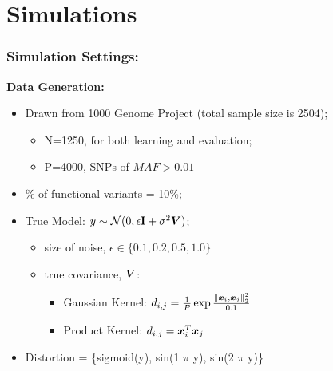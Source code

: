 \documentclass{beamer}
\begin{document}
\section{Simulations}
\begin{frame}
\frametitle{Simulation Settings:}
\textbf{Data Generation:}
\begin{itemize}
\item Drawn from 1000 Genome Project (total sample size is 2504);
  \begin{itemize}
  \item N=1250, for both learning and evaluation;
  \item P=4000, SNPs of $MAF > 0.01$
  \end{itemize}
\item \% of functional variants = 10\%;
\item True Model: $y \sim \mathcal{N}(0, \epsilon \textrm{\textbf{I}} + \sigma^2 \boldsymbol{V})$;
  \begin{itemize}
    \item size of noise, $\epsilon \in \{0.1, 0.2, 0.5, 1.0\}$
    \item true covariance, $\boldsymbol{V}$:
      \begin{itemize}
      \item Gaussian Kernel: $d_{i,j}=\frac{1}{P} \exp{\frac{\left\lVert\boldsymbol{x}_i, \boldsymbol{x}_j\right\rVert_2^2}{0.1}}$
      \item Product Kernel: $d_{i,j}=\boldsymbol{x}_i^T \boldsymbol{x}_j$
      \end{itemize}
  \end{itemize}
\item Distortion = \{sigmoid(y), sin(1 $\pi$ y), sin(2 $\pi$ y)\}
\end{itemize}
\end{frame}
\end{document}
